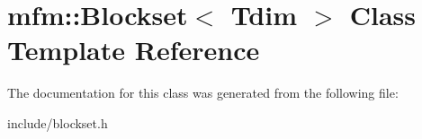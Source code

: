 \hypertarget{classmfm_1_1_blockset}{}\section{mfm\+:\+:Blockset$<$ Tdim $>$ Class Template Reference}
\label{classmfm_1_1_blockset}


The documentation for this class was generated from the following file\+:\begin{DoxyCompactItemize}
\item 
include/blockset.\+h\end{DoxyCompactItemize}
